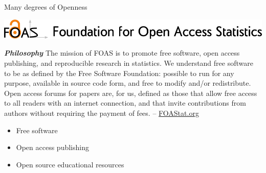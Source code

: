 
\begin{frame}{Many degrees of Openness}

\includegraphics[width=\linewidth]{FOASLogo.png}


{\footnotesize {\bf \em Philosophy} The mission of FOAS is to promote free software, open access publishing, and reproducible research in statistics. We understand free software to be as defined by the Free Software Foundation: possible to run for any purpose, available in source code form, and free to modify and/or redistribute. Open access forums for papers are, for us, defined as those that allow free access to all readers with an internet connection, and that invite contributions from authors without requiring the payment of fees. -- \href{http://www.foastat.org}{FOAStat.org}

}


\begin{itemize}
  \item Free software
	\item Open access publishing
	\item Open source educational resources
\end{itemize}

\end{frame}




